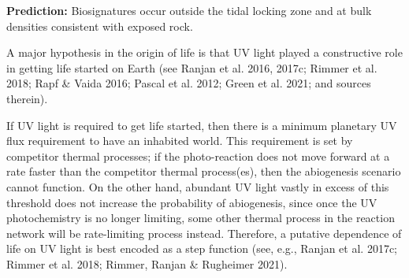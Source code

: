\documentclass[twocolumn,twocolappendix,linenumbers]{aastex631}
\begin{document}
\textbf{Prediction:} Biosignatures occur outside the tidal locking zone and at bulk densities consistent with exposed rock.


A major hypothesis in the origin of life is that UV light played a constructive role in getting life started on Earth (see Ranjan et al. 2016, 2017c; Rimmer et al. 2018; Rapf \& Vaida 2016; Pascal et al. 2012; Green et al. 2021; and sources therein).

If UV light is required to get life started, then there is a minimum planetary UV flux requirement to have an inhabited world.
This requirement is set by competitor thermal processes; if the photo-reaction does not move forward at a rate faster than the competitor thermal process(es), then the abiogenesis scenario cannot function.
On the other hand, abundant UV light vastly in excess of this threshold does not increase the probability of abiogenesis, since once the UV photochemistry is no longer limiting, some other thermal process in the reaction network will be rate-limiting process instead.
Therefore, a putative dependence of life on UV light is best encoded as a step function (see, e.g., Ranjan et al. 2017c; Rimmer et al. 2018; Rimmer, Ranjan \& Rugheimer 2021).
\end{document}
